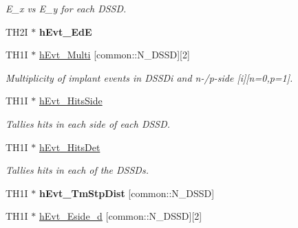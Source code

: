 \begin{DoxyCompactItemize}
\begin{DoxyCompactList}\small\item\em E\-\_\-x vs E\-\_\-y for each D\-S\-S\-D. \end{DoxyCompactList}\item 
\hypertarget{classAnalysis_afe0583ce3c3ab944bbe97d279d402f48}{T\-H2\-I $\ast$ {\bfseries h\-Evt\-\_\-\-Ed\-E}}\label{classAnalysis_afe0583ce3c3ab944bbe97d279d402f48}

\item 
\hypertarget{classAnalysis_a35f940e08d31e82bdb99ecf4756952d1}{T\-H1\-I $\ast$ \hyperlink{classAnalysis_a35f940e08d31e82bdb99ecf4756952d1}{h\-Evt\-\_\-\-Multi} \mbox{[}common\-::\-N\-\_\-\-D\-S\-S\-D\mbox{]}\mbox{[}2\mbox{]}}\label{classAnalysis_a35f940e08d31e82bdb99ecf4756952d1}

\begin{DoxyCompactList}\small\item\em Multiplicity of implant events in D\-S\-S\-Di and n-\//p-\/side \mbox{[}i\mbox{]}\mbox{[}n=0,p=1\mbox{]}. \end{DoxyCompactList}\item 
\hypertarget{classAnalysis_a06acbcd8fdb8ada061063d3acbf834c8}{T\-H1\-I $\ast$ \hyperlink{classAnalysis_a06acbcd8fdb8ada061063d3acbf834c8}{h\-Evt\-\_\-\-Hits\-Side}}\label{classAnalysis_a06acbcd8fdb8ada061063d3acbf834c8}

\begin{DoxyCompactList}\small\item\em Tallies hits in each side of each D\-S\-S\-D. \end{DoxyCompactList}\item 
\hypertarget{classAnalysis_ab7100d431ca0c14209384d79fcc4ebbb}{T\-H1\-I $\ast$ \hyperlink{classAnalysis_ab7100d431ca0c14209384d79fcc4ebbb}{h\-Evt\-\_\-\-Hits\-Det}}\label{classAnalysis_ab7100d431ca0c14209384d79fcc4ebbb}

\begin{DoxyCompactList}\small\item\em Tallies hits in each of the D\-S\-S\-Ds. \end{DoxyCompactList}\item 
\hypertarget{classAnalysis_a6a965a0a3bcf9764dc7a84b3b5046663}{T\-H1\-I $\ast$ {\bfseries h\-Evt\-\_\-\-Tm\-Stp\-Dist} \mbox{[}common\-::\-N\-\_\-\-D\-S\-S\-D\mbox{]}}\label{classAnalysis_a6a965a0a3bcf9764dc7a84b3b5046663}

\item 
\hypertarget{classAnalysis_a142c688928d7a9956b0822c959e0bc18}{T\-H1\-I $\ast$ \hyperlink{classAnalysis_a142c688928d7a9956b0822c959e0bc18}{h\-Evt\-\_\-\-Eside\-\_\-d} \mbox{[}common\-::\-N\-\_\-\-D\-S\-S\-D\mbox{]}\mbox{[}2\mbox{]}}\label{classAnalysis_a142c688928d7a9956b0822c959e0bc18}


\end{DoxyCompactItemize}
